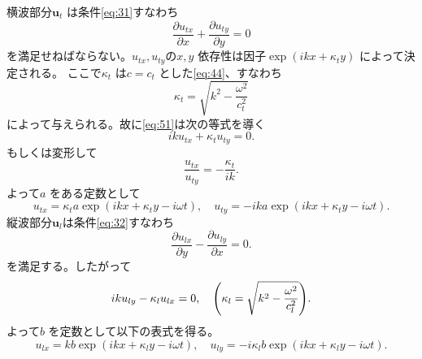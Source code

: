 \documentclass[dvipdfmx,11pt]{jsreport}
\numberwithin{equation}{chapter}
\numberwithin{table}{chapter}
\begin{document}
横波部分$\bm{u}_t$ は条件\eqref{eq:31}すなわち
\begin{equation}
\label{eq:51}
	\frac{\partial u_{tx}}{\partial x} +\frac{\partial u_{ty}}{\partial y} =0
\end{equation}
を満足せねばならない。$u_{tx},u_{ty}$の$x,y$ 依存性は因子$\exp (ikx+\kappa_ty)$ によって決定される。
ここで$\kappa_t$ は$c=c_t$ とした\eqref{eq:44}、すなわち
\begin{equation}
\label{eq:52}
	\kappa_t=\sqrt{k^2-\frac{\omega^2}{c_t^2}} 
\end{equation}
によって与えられる。故に\eqref{eq:51}は次の等式を導く
\begin{equation}
\label{eq:53}
	iku_{tx}+\kappa_tu_{ty}=0
.\end{equation}
もしくは変形して
\begin{equation}
\label{eq:54}
	\frac{u_{tx}}{u_{ty}}=-\frac{\kappa_t}{ik}
.\end{equation}
よって$a$ をある定数として
\begin{equation}
\label{eq:55}
	u_{tx}=\kappa_ta\exp (ikx+\kappa_t y-i\omega t),\quad u_{ty}=-ika\exp (ikx + \kappa_t y -i\omega t)
.\end{equation}
縦波部分$\bm{u}_{l}$は条件\eqref{eq:32}すなわち
\begin{equation}
\label{eq:56}
\frac{\partial u_{lx}}{\partial y} -\frac{\partial u_{ly}}{\partial x} =0
.\end{equation}
を満足する。したがって
\begin{equation}
\label{eq:57}
	iku_{ly}-\kappa_lu_{lx}=0,\quad \qty(\kappa_l=\sqrt{k^2-\frac{\omega^2}{c_l^2}} )
.\end{equation}
よって$b$ を定数として以下の表式を得る。
\begin{equation}
\label{eq:58}
	u_{lx}=kb\exp (ikx+\kappa_ly-i\omega t),\quad u_{ly}=-i\kappa_lb\exp (ikx +\kappa_l y -i\omega t)
.\end{equation}
\end{document}
